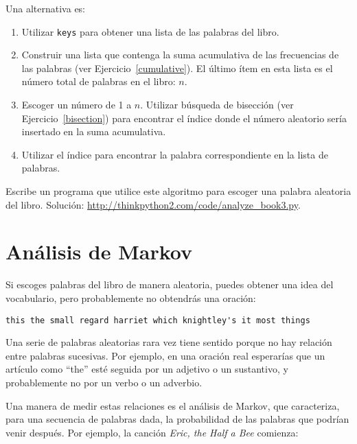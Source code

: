 \documentclass[10pt]{book}
\begin{document}
Una alternativa es:

\begin{enumerate}

\item Utilizar {\tt keys} para obtener una lista de las palabras del libro.

\item Construir una lista que contenga la suma acumulativa de las frecuencias
  de las palabras (ver Ejercicio~\ref{cumulative}).  El último ítem
  en esta lista es el número total de palabras en el libro: $n$.

\item Escoger un número de 1 a $n$.  Utilizar búsqueda de bisección
  (ver Ejercicio~\ref{bisection}) para encontrar el índice donde el número
  aleatorio sería insertado en la suma acumulativa.

\item Utilizar el índice para encontrar la palabra correspondiente en la lista de palabras.

\end{enumerate}

\begin{exercise}
\label{randhist}

Escribe un programa que utilice este algoritmo para escoger una palabra aleatoria del
libro.  Solución:
\url{http://thinkpython2.com/code/analyze_book3.py}.

\end{exercise}



\section{Análisis de Markov}
\label{markov}

Si escoges palabras del libro de manera aleatoria, puedes obtener una
idea del vocabulario, pero probablemente no obtendrás una oración:

\begin{verbatim}
this the small regard harriet which knightley's it most things
\end{verbatim}
%
Una serie de palabras aleatorias rara vez tiene sentido porque
no hay relación entre palabras sucesivas.  Por ejemplo, en
una oración real esperarías que un artículo como ``the'' esté
seguida por un adjetivo o un sustantivo, y probablemente no por un verbo
o un adverbio.

Una manera de medir estas relaciones es el análisis de
Markov, que
caracteriza, para una secuencia de palabras dada, la probabilidad de las
palabras que podrían venir después.  Por ejemplo, la canción {\em Eric, the Half a
  Bee} comienza:
\end{document}

